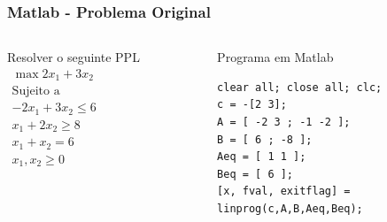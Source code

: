 \documentclass{beamer}
\begin{document}
\begin{frame}[fragile]
	\frametitle{Matlab - Problema Original}
	\begin{columns}
		\begin{column}{5cm}
			\begin{block}{Resolver o seguinte PPL}
				\centering
				$
					\begin{matrix}
						\max 2x_1+3x_2 \\
						\text{Sujeito a} \\
						-2x_1+3x_2 \le 6 \\
						x_1 + 2x_2 \ge 8 \\
						x_1 + x_2 = 6 \\
						x_1, x_2 \ge 0 \\
					\end{matrix}
				$
			\end{block}
		\end{column}
		\begin{column}{5cm}
			\begin{block}{Programa em Matlab}
				\begin{lstlisting}[basicstyle=\tiny]  
clear all; close all; clc;
c = -[2 3];
A = [ -2 3 ; -1 -2 ];
B = [ 6 ; -8 ];
Aeq = [ 1 1 ];
Beq = [ 6 ];
[x, fval, exitflag] = linprog(c,A,B,Aeq,Beq);
				\end{lstlisting}			
			\end{block}
		\end{column}
	\end{columns}
\end{frame}
\end{document}
